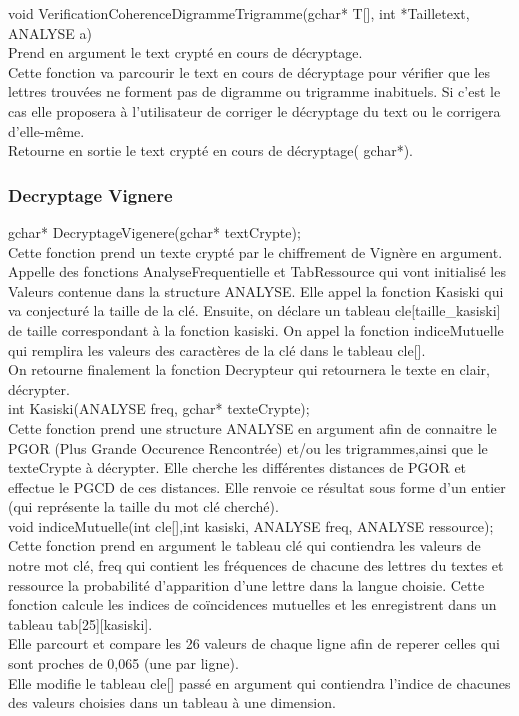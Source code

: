 \documentclass[a4]{article}
\begin{document}
	void VerificationCoherenceDigrammeTrigramme(gchar* T[], int *Tailletext, ANALYSE a)\\
		Prend en argument le text crypté en cours de décryptage.\\
		Cette fonction va parcourir le text en cours de décryptage pour vérifier que les lettres trouvées 
		ne forment pas de digramme ou trigramme inabituels. Si c'est le cas elle proposera à l'utilisateur 
		de corriger le décryptage du text ou le corrigera d'elle-même.\\
		Retourne en sortie le text crypté en cours de décryptage( gchar*).\\
	
	
	\subsubsection{Decryptage Vignere}
	gchar* DecryptageVigenere(gchar* textCrypte);\\
		Cette fonction prend un texte crypté par le chiffrement de Vignère en argument.
		Appelle des fonctions AnalyseFrequentielle et TabRessource qui vont initialisé les Valeurs 
		contenue dans la structure ANALYSE.
		Elle appel la fonction Kasiski qui va conjecturé la taille de la clé.
		Ensuite, on déclare un tableau cle[taille_kasiski] de taille correspondant à la fonction kasiski. 
		On appel la fonction indiceMutuelle qui remplira les valeurs des caractères de la clé dans le tableau cle[].\\
		On retourne finalement la fonction Decrypteur qui retournera le texte en clair, décrypter.\\
	
	int Kasiski(ANALYSE freq, gchar* texteCrypte);\\
		Cette fonction prend une structure ANALYSE en argument afin de connaitre le 
		PGOR (Plus Grande Occurence Rencontrée) et/ou les trigrammes,ainsi que le texteCrypte à décrypter.
		Elle cherche les différentes distances de PGOR et effectue le PGCD de ces distances.
		Elle renvoie ce résultat sous forme d'un entier (qui représente la taille du mot clé cherché).\\
	
	void indiceMutuelle(int cle[],int kasiski, ANALYSE freq, ANALYSE ressource);\\
		Cette fonction prend en argument le tableau clé qui contiendra les valeurs de notre mot clé,
		 freq qui contient les fréquences de chacune des lettres du textes et ressource la
		probabilité d'apparition d'une lettre dans la langue choisie.
		Cette fonction calcule les indices de coïncidences mutuelles et les enregistrent dans un tableau tab[25][kasiski].\\
		Elle parcourt et compare les 26 valeurs de chaque ligne afin de reperer celles qui sont proches de 0,065 (une par ligne).\\
		Elle modifie le tableau cle[] passé en argument qui contiendra l'indice de chacunes des valeurs choisies dans un tableau à une dimension. \\
	
\end{document}
